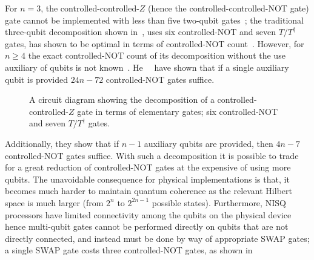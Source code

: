  \bigskip
 \noindent
 For $n=3$, the controlled-controlled-$Z$ (hence the controlled-controlled-NOT gate) gate cannot be implemented with less than five two-qubit gates~\cite{Yu_2013}; the traditional three-qubit decomposition shown in~, uses six controlled-NOT and seven $T/T^{\dagger}$ gates, has shown to be optimal in terms of controlled-NOT count~\cite{Shende_2008}. However, for $n\geq4$ the exact controlled-NOT count of its decomposition without the use auxiliary of qubits is not known~\cite{Shende_2008}. He~\etal~\cite{He_2017} have shown that if a single auxiliary qubit is provided $24n − 72$ controlled-NOT gates suffice.

\clearpage
\begin{figure}[t!]
	\centering
	\caption[A circuit diagram showing the decomposition of a controlled-controlled-$Z$ gate in terms of elementary gates.]{A circuit diagram showing the decomposition of a controlled-controlled-$Z$ gate in terms of elementary gates; six controlled-NOT and seven $T/T^{\dagger}$ gates.}
\end{figure}

\noindent
Additionally, they show that if $n-1$ auxiliary qubits are provided, then $4n − 7$ controlled-NOT gates suffice. With such a decomposition it is possible to trade for a great reduction of controlled-NOT gates at the expensive of using more qubits. The unavoidable consequence for physical implementations is that, it becomes much harder to maintain quantum coherence as the relevant Hilbert space is much larger (from $2^n$ to $2^{2n -1}$ possible states). Furthermore, \acs{NISQ} processors have limited connectivity among the qubits on the physical device hence multi-qubit gates cannot be performed directly on qubits that are not directly connected, and instead must be done by way of appropriate SWAP gates; a single SWAP gate costs three controlled-NOT gates, as shown in~

